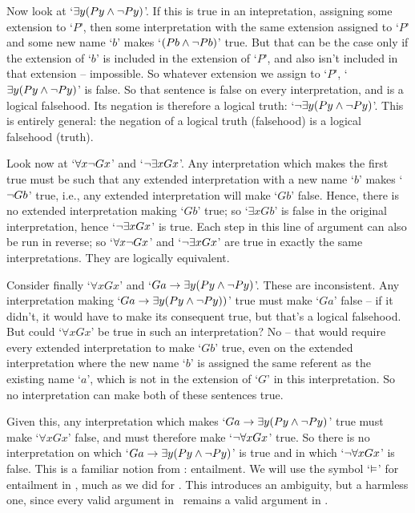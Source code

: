 Now look at `$\exists y (Py \wedge \neg Py)$'. If this is true in an intepretation, assigning some extension to `$P$', then some interpretation with the same extension assigned to `$P$' and some new name `$b$' makes `$(Pb \wedge \neg Pb)$' true. But that can be the case only if the extension of `$b$' is included in the extension of `$P$', and also isn't included in that extension – impossible. So whatever extension we assign to `$P$', `$\exists y (Py \wedge \neg Py)$' is false. So that sentence is false on every interpretation, and is a logical falsehood. Its negation is therefore a logical truth: `$\neg \exists y (Py \wedge \neg Py)$'. This is entirely general: the negation of a logical truth (falsehood) is a logical falsehood (truth).

Look now at `$\forall x \neg Gx$' and `$\neg \exists x Gx$'. Any interpretation which makes the first true must be such that any extended interpretation with a new name `$b$' makes `$\neg Gb$' true, i.e., any extended interpretation will make `$Gb$' false. Hence, there is no extended interpretation making `$Gb$' true; so `$\exists x Gb$' is false in the original interpretation, hence `$\neg\exists x Gx$' is true. Each step in this line of argument can also be run in reverse; so `$\forall x \neg Gx$' and `$\neg\exists x Gx$' are true in exactly the same interpretations. They are logically equivalent. 


Consider finally `$\forall x Gx$' and `$Ga \rightarrow \exists y (Py \wedge \neg Py)$'. These are inconsistent. Any interpretation making `$Ga \rightarrow \exists y(Py \wedge \neg Py))$' true must make `$Ga$' false – if it didn't, it would have to make its consequent true, but that's a logical falsehood. But could `$\forall x Gx$' be true in such an interpretation? No – that would require every extended interpretation to make `$Gb$' true, even on the extended interpretation where the new name `$b$' is assigned the same referent as the existing name `$a$', which is not in the extension of `$G$' in this interpretation. So no interpretation can make both of these sentences true.

Given this, any interpretation which makes `$Ga \rightarrow \exists y (Py \wedge \neg Py)$' true must make `$\forall x Gx$' false, and must therefore make `$\neg \forall x Gx$' true. So there is no interpretation on which `$Ga \rightarrow \exists y (Py \wedge \neg Py)$' is true and in which `$\neg \forall x Gx$' is false.  This is a familiar notion from \TFL: entailment. We will use the symbol `$\vDash$' for entailment in \FOL, much as we did for \TFL. This introduces an ambiguity, but a harmless one, since every valid argument in \TFL\ remains a valid argument in \FOL.  

